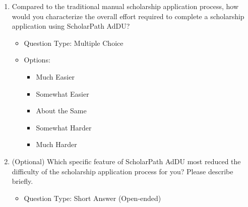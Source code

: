 \begin{enumerate}[resume=q, label={Question \arabic*:}, leftmargin=*, align=left]
  \item Compared to the traditional manual scholarship application process, how would you characterize the overall effort required to complete a scholarship application using ScholarPath AdDU?
  \begin{itemize}[leftmargin=*]
    \item Question Type: Multiple Choice
    \item Options:
    \begin{itemize}[leftmargin=*]
      \item Much Easier
      \item Somewhat Easier
      \item About the Same
      \item Somewhat Harder
      \item Much Harder
    \end{itemize}
  \end{itemize}
  \item (Optional) Which specific feature of ScholarPath AdDU most reduced the difficulty of the scholarship application process for you? Please describe briefly.
  \begin{itemize}[leftmargin=*]
    \item Question Type: Short Answer (Open-ended)
  \end{itemize}
\end{enumerate}

